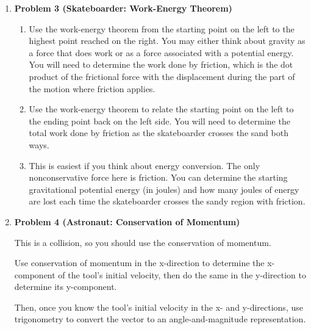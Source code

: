 \documentclass[12pt]{article}
\begin{document}
\begin{enumerate}
\item \bf Problem 3 (Skateboarder:  Work-Energy Theorem) \rm
\begin{enumerate}
	\item Use the work-energy theorem from the starting point on the left to the highest point reached on the right. You may either think about gravity as a force that does work or as a force associated with a potential energy. You will need to determine the work done by friction, which is the dot product of the frictional force with the displacement during the part of the motion where friction applies.
	\item Use the work-energy theorem to relate the starting point on the left to the ending point back on the left side. You will need to determine the total work done by friction as the skateboarder crosses the sand both ways.
	\item This is easiest if you think about energy conversion. The only nonconservative force here is friction. You can determine the starting gravitational potential energy (in joules) and how many joules of energy are lost each time the skateboarder crosses the sandy region with friction.
\end{enumerate} 

\item \bf  Problem 4 (Astronaut: Conservation of Momentum)\rm

This is a collision, so you should use the conservation of momentum.

Use conservation of momentum in the x-direction to determine the x-component of the tool's initial velocity, then do the same in the y-direction to determine its y-component.

Then, once you know the tool's initial velocity in the x- and y-directions, use trigonometry to convert the vector to an angle-and-magnitude representation.


\end{enumerate}
%
%
\end{document}
